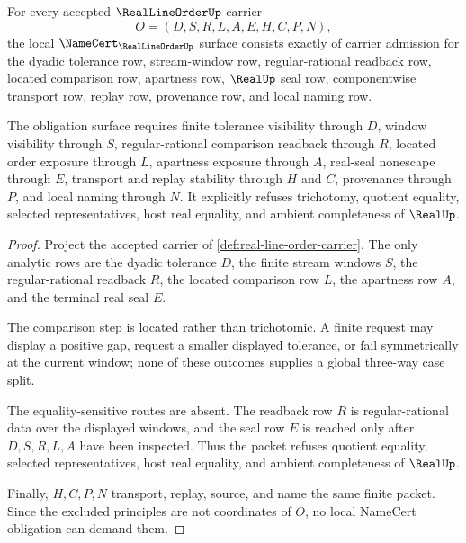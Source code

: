\begin{theorem}
\label{thm:real-line-order-namecert-obligations}
For every accepted $\RealLineOrderUp$ carrier
$$
O=(D,S,R,L,A,E,H,C,P,N),
$$
the local $\NameCert_{\RealLineOrderUp}$ surface consists exactly of carrier admission for the dyadic tolerance row, stream-window row, regular-rational readback row, located comparison row, apartness row, $\RealUp$ seal row, componentwise transport row, replay row, provenance row, and local naming row.

The obligation surface requires finite tolerance visibility through $D$, window visibility through $S$, regular-rational comparison readback through $R$, located order exposure through $L$, apartness exposure through $A$, real-seal nonescape through $E$, transport and replay stability through $H$ and $C$, provenance through $P$, and local naming through $N$. It explicitly refuses trichotomy, quotient equality, selected representatives, host real equality, and ambient completeness of $\RealUp$.
\end{theorem}
\begin{proof}
Project the accepted carrier of \autoref{def:real-line-order-carrier}. The only analytic rows are the dyadic tolerance $D$, the finite stream windows $S$, the regular-rational readback $R$, the located comparison row $L$, the apartness row $A$, and the terminal real seal $E$.

The comparison step is located rather than trichotomic. A finite request may display a positive gap, request a smaller displayed tolerance, or fail symmetrically at the current window; none of these outcomes supplies a global three-way case split.

The equality-sensitive routes are absent. The readback row $R$ is regular-rational data over the displayed windows, and the seal row $E$ is reached only after $D,S,R,L,A$ have been inspected. Thus the packet refuses quotient equality, selected representatives, host real equality, and ambient completeness of $\RealUp$.

Finally, $H,C,P,N$ transport, replay, source, and name the same finite packet. Since the excluded principles are not coordinates of $O$, no local NameCert obligation can demand them.
\end{proof}


